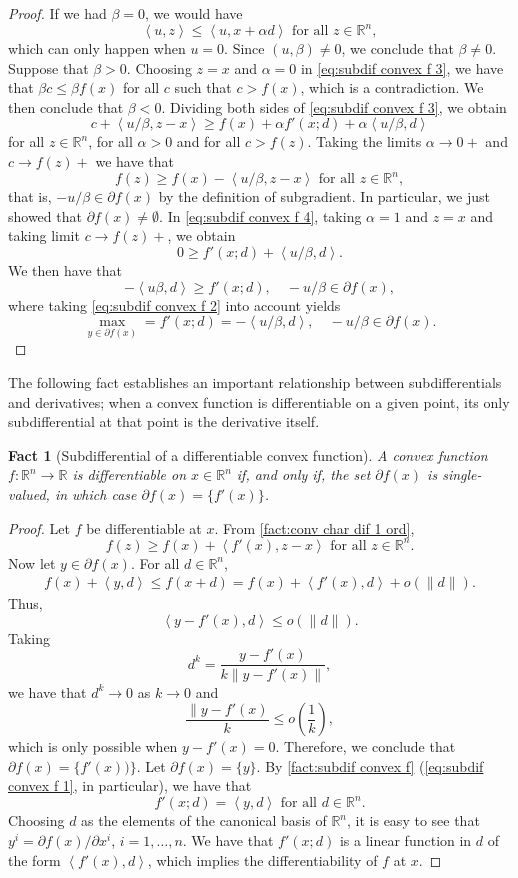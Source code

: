 \documentclass[smallextended,numbook,nospthms]{svjour3}
\theoremstyle{plain}
\newtheorem{fact}[theorem]{Fact}
\theoremstyle{definition}
\def\RR{\mathds R}
\newcommand{\scal}[2]{\left\langle{#1},{#2}  \right\rangle}
\begin{document}
\begin{proof}
	If we had $\beta = 0$, we would have
	\[
	\scal{u}{z} \leq \scal{u}{x + \alpha d} \text{ for all } z \in \RR^n,
	\]
	which can only happen when $u=0$. Since $(u,\beta)\not=0$, we conclude that $\beta \not=0$.
	Suppose that $\beta>0$. Choosing $z=x$ and $\alpha=0$ in \cref{eq:subdif convex f 3}, we have that $\beta c \leq \beta f(x)$ for all $c$ such that $c > f(x)$, which is a contradiction. We then conclude that $\beta <0$.
	Dividing both sides of \cref{eq:subdif convex f 3}, we obtain
	\[
	c+\scal{u/\beta}{z-x} \geq f(x) + \alpha f'(x;d)+\alpha\scal{u/\beta}{d} \label{eq:subdif convex f 4}
	\]
	for all $z \in \RR^n$, for all $\alpha > 0$ and for all $c > f(z)$.
	Taking the limits $\alpha \rightarrow 0+$ and $c \rightarrow f(z)+$ we have that
	\[
	f(z) \geq f(x) - \scal{u/\beta}{z-x} \text{ for all } z \in \RR^n,
	\]
	that is, $-u/\beta \in \partial f(x)$ by the definition of subgradient. In particular, we just showed that $\partial f(x) \not= \emptyset$.
	In \cref{eq:subdif convex f 4}, taking $\alpha=1$ and $z=x$ and taking limit $c \rightarrow f(z)+$, we obtain
	\[
	0 \geq f'(x;d) + \scal{u/\beta}{d}.
	\]
	We then have that
	\[
	-\scal{u\beta}{d} \geq f'(x;d), \quad -u/\beta \in \partial f(x),
	\]
	where taking \cref{eq:subdif convex f 2} into account yields
	\[
	\max_{y \in \partial f(x)} = f'(x;d) = -\scal{u/\beta}{d}, \quad -u/\beta \in \partial f(x).
	\]
\end{proof}

The following fact establishes an important relationship between subdifferentials and derivatives; when a convex function is differentiable on a given point, its only subdifferential at that point is the derivative itself. 
\begin{fact}[Subdifferential of a differentiable convex function]
	A convex function $f:\RR^n \rightarrow \RR$ is differentiable on $x \in \RR^n$ if, and only if, the set $\partial f(x)$ is single-valued, in which case $\partial f(x)=\{f'(x)\}$.
\end{fact}
\begin{proof}
	Let $f$ be differentiable at $x$. From \cref{fact:conv char dif 1 ord},
	\[
	f(z) \geq f(x) + \scal{f'(x)}{z-x} \text{ for all } z \in \RR^n.
	\]
	Now let $y \in \partial f(x)$. For all $d \in \RR^n$,
	\begin{align}
		f(x) + \scal{y}{d} \leq f(x+d) = f(x) + \scal{f'(x)}{d} + o(\|d\|).
	\end{align}
	Thus,
	\[
	\scal{y-f'(x)}{d}\leq o(\|d\|).
	\]
	Taking
	\[
	d^k = \frac{y-f'(x)}{k\|y-f'(x)\|},
	\]
	we have that $d^k \rightarrow 0$ as $k \rightarrow 0$ and
	\[
	\frac{\|y-f'(x)}{k} \leq o(\frac{1}{k}),
	\]
	which is only possible when $y-f'(x)=0$. Therefore, we conclude that $\partial f(x)=\{f'(x))\}$.	
	Let $\partial f(x)=\{y\}$. By \cref{fact:subdif convex f} (\cref{eq:subdif convex f 1}, in particular), we have that
	\[
	f'(x;d)=\scal{y}{d} \text{ for all } d \in \RR^n.
	\]
	Choosing $d$ as the elements of the canonical basis of $\RR^n$, it is easy to see that $y^i=\partial f(x)/\partial x^i$, $i=1,\ldots,n$. We have that $f'(x;d)$ is a linear function in $d$ of the form $\scal{f'(x)}{d}$, which implies the differentiability of $f$ at $x$. 
\end{proof}
\end{document}
